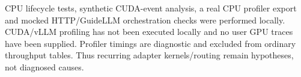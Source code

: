CPU lifecycle tests, synthetic CUDA-event analysis, a real CPU profiler export
and mocked HTTP/GuideLLM orchestration checks were performed locally. CUDA/vLLM
profiling has not been executed locally and no user GPU traces have been supplied.
Profiler timings are diagnostic and excluded from ordinary throughput tables.
Thus recurring adapter kernels/routing remain hypotheses, not diagnosed causes.
